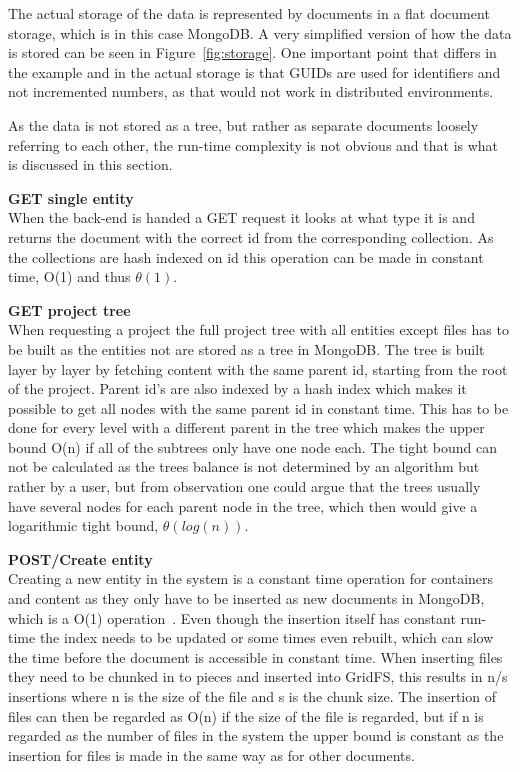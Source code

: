 \documentclass[a4paper,12pt]{article}
\begin{document}
The actual storage of the data is represented by documents in a flat document storage, which is in
this case MongoDB. A very simplified version of how the data is stored can be seen in
Figure~\ref{fig:storage}. One important point that differs in the example and in the actual storage
is that GUIDs are used for identifiers and not incremented numbers, as that would not work in
distributed environments. 

As the data is not stored as a tree, but rather as separate documents loosely referring to each
other, the run-time complexity is not obvious and that is what is discussed in this section.\\

\par \textbf{GET single entity} \\
When the back-end is handed a GET request it looks at what type it is and returns the document with
the correct id from the corresponding collection. As the collections are hash indexed on id this
operation can be made in constant time, O(1) and thus $\theta(1)$. \\

\par \textbf{GET project tree} \\
When requesting a project the full project tree with all entities except files has to be built as
the entities not are stored as a tree in MongoDB. The tree is built layer by layer by fetching
content with the same parent id, starting from the root of the project. Parent id's are also indexed
by a hash index which makes it possible to get all nodes with the same parent id in constant time.
This has to be done for every level with a different parent in the tree which makes the upper bound
O(n) if all of the subtrees only have one node each. The tight bound can not be calculated as the
trees balance is not determined by an algorithm but rather by a user, but from observation one could
argue that the trees usually have several nodes for each parent node in the tree, which then would
give a logarithmic tight bound, $\theta(log(n))$.\\

\par \textbf{POST/Create entity} \\
Creating a new entity in the system is a constant time operation for containers and content as they
only have to be inserted as new documents in MongoDB, which is a O(1)
operation~\cite{MONGOPERFOMANCE}. Even though the insertion itself has constant run-time the index
needs to be updated or some times even rebuilt, which can slow the time before the document is
accessible in constant time. When inserting files they need to be chunked in to pieces and inserted
into GridFS, this results in n/s insertions where n is the size of the file and s is the chunk size.
The insertion of files can then be regarded as O(n) if the size of the file is regarded, but if n is
regarded as the number of files in the system the upper bound is constant as the insertion for files
is made in the same way as for other documents.\\
\end{document}
